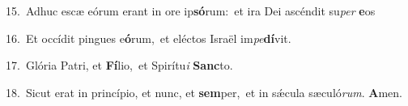 {\numbfont\textcolor{\numbcolor}{15.}}~Adhuc escæ eórum erant in ore ip\-\textbf{só}\-rum:~\star et ira Dei ascéndit su\textit{per} \textbf{e}\-os\par
{\numbfont\textcolor{\numbcolor}{16.}}~Et occídit pingues e\-\textbf{ó}\-rum,~\star et eléctos Israël im\-\textit{pe}\-\textbf{dí}vit.\par
{\numbfont\textcolor{\numbcolor}{17.}}~Glória Patri, et \textbf{Fí}\-lio,~\star et Spirítu\textit{i} \textbf{Sanc}\-to.\par
{\numbfont\textcolor{\numbcolor}{18.}}~Sicut erat in princípio, et nunc, et \textbf{sem}\-per,~\star et in sǽcula sæculó\-\textit{rum}\-. \textbf{A}\-men.\par
